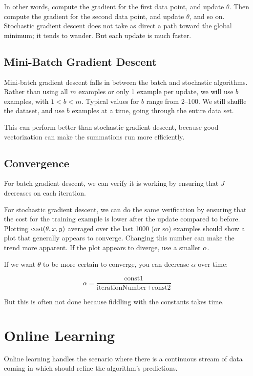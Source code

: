 In other words, compute the gradient for the first data point, and update $\theta$.
Then compute the gradient for the second data point, and update $\theta$, and so on.
Stochastic gradient descent does not take as direct a path toward the global minimum;
it tends to wander.
But each update is much faster.

\subsection{Mini-Batch Gradient Descent}

Mini-batch gradient descent falls in between the batch and stochastic algorithms.
Rather than using all $m$ examples or only 1 example per update, we will use $b$
examples, with $1<b<m$.
Typical values for $b$ range from 2--100.
We still shuffle the dataset, and use $b$ examples at a time, going through the entire data set.

This can perform better than stochastic gradient descent, because good vectorization can
make the summations run more efficiently.

\subsection{Convergence}

For batch gradient descent, we can verify it is working by
ensuring that $J$ decreases on each iteration.

For stochastic gradient descent, we can do the same verification by ensuring that
the cost for the training example is lower after the update compared to before.
Plotting $\operatorname{cost}(\theta, x, y)$ averaged over the last 1000 (or so) examples should show a
plot that generally appears to converge.
Changing this number can make the trend more apparent.
If the plot appears to diverge, use a smaller $\alpha$.

If we want $\theta$ to be more certain to converge, you can decrease $\alpha$ over time:

\[ \alpha = \frac{\text{const1}}{\text{iterationNumber} + \text{const2}} \]

But this is often not done because fiddling with the constants takes time.

\section{Online Learning}

Online learning handles the scenario where there is a continuous stream of data coming in which
should refine the algorithm's predictions.

